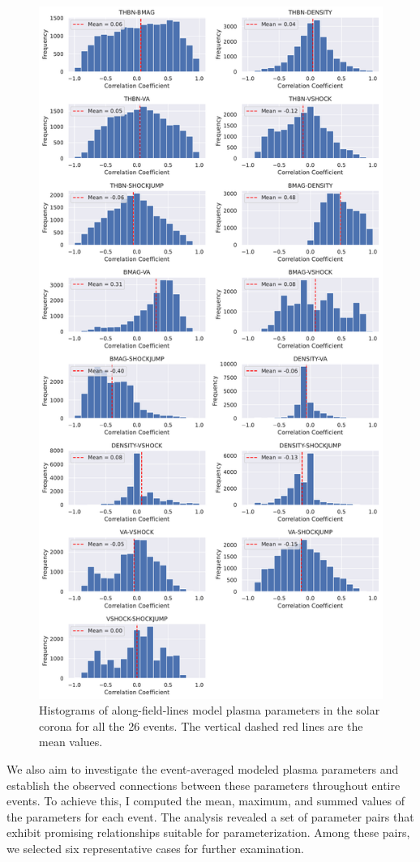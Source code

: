 \begin{figure}[!htp] %
	\centerline{\includegraphics[width=0.7\columnwidth]{chapter2/figs/wp3_d2_Fig16.pdf}}
	\caption{Histograms of along-field-lines model plasma parameters in the solar corona for all the 26 events. The vertical dashed red lines are the mean values.}
	\label{fig_hist_plasma_param_corr}
\end{figure}

We also aim to investigate the event-averaged modeled plasma parameters and establish the observed connections between these parameters throughout entire events. To achieve this, I computed the mean, maximum, and summed values of the parameters for each event. The analysis revealed a set of parameter pairs that exhibit promising relationships suitable for parameterization. Among these pairs, we selected six representative cases for further examination.


